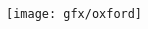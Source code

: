 \begin{titlepage}
    \begin{addmargin}[-1cm]{-3cm}
    \begin{center}
        \large  

        \hfill

        \vfill

        \begingroup
            \spacedallcaps{\myTitle} \\ \bigskip
        \endgroup

        \spacedlowsmallcaps{\myName}

        \vfill

        \texttt{[image: gfx/oxford]} \\ \medskip

        \vspace{2pt} 
        \myCollege \\
        \myUni \\ \bigskip

        \myTime\ %

        \vfill                      

    \end{center}  
  \end{addmargin}       
\end{titlepage}   
